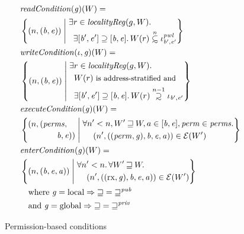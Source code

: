 \documentclass[compsoc,conference,letterpaper,fleqn]{IEEEtran}
\newcommand\subsetsim{\mathrel{\ooalign{\raise.2ex\hbox{$\subset$}\cr
      \hidewidth\lower.8ex\hbox{\scalebox{0.9}{$\sim$}}\hidewidth\cr}}}
\newcommand\supsetsim{\mathrel{\ooalign{\raise.2ex\hbox{$\supset$}\cr
      \hidewidth\lower.8ex\hbox{\scalebox{0.9}{$\sim$}}\hidewidth\cr}}}
\newcommand{\nsubsim}[1][n]{\stackrel{\tiny{#1}}{\subsetsim}}
\newcommand{\nsupsim}[1][n]{\stackrel{\tiny{#1}}{\supsetsim}}
\newcommand{\var}[1]{\mathit{#1}}
\newcommand{\gl}{\var{g}}
\newcommand{\addr}{\var{a}}
\newcommand{\start}{\var{b}}
\newcommand{\addrend}{\var{e}}
\newcommand{\perm}{\var{perm}}
\newcommand{\pwl}{\var{pwl}}
\newcommand{\plainfun}[2]{
  \ifthenelse{\equal{#2}{}}
  {\mathit{#1}}
  {\mathit{#1}(#2)}
}
\newcommand{\readCond}[1]{\plainfun{readCondition}{#1}}
\newcommand{\writeCond}[1]{\plainfun{writeCondition}{#1}}
\newcommand{\execCond}[1]{\plainfun{executeCondition}{#1}}
\newcommand{\entryCond}[1]{\plainfun{enterCondition}{#1}}
\newcommand{\future}{\mathbin{\sqsupseteq}}
\newcommand{\futurewk}{\mathbin{\sqsupseteq}^{\var{pub}}}
\newcommand{\futurestr}{\mathbin{\sqsupseteq}^{\var{priv}}}
\newcommand{\asmType}{\plaindom{AsmType}}
\newcommand{\plaindom}[1]{\mathrm{#1}}
\newcommand{\intr}[2]{\mathcal{#1}}
\newcommand{\exprintr}[1]{\intr{E}{#1}}
\newcommand{\stder}{\exprintr{\asmType}}
\newcommand{\npair}[2][n]{\left(#1,#2 \right)}
\newcommand{\npairP}[2][n]{(#1,#2)}
\newcommand{\plainperm}[1]{\mathrm{#1}}
\newcommand{\exec}{\plainperm{rx}}
\newcommand{\local}{\plainperm{local}}
\newcommand{\glob}{\plainperm{global}}
\begin{document}
{\begin{figure}[htbp]
  \centering
  \begin{align*}
  & \readCond{}(\gl)(W) =  \\
  & \left\{ \npair{(\start,\addrend)} \; \middle| \;
    \begin{aligned}
      & \exists r \in \var{localityReg}(g,W) \ldotp \\
      & \;\; \exists [\start',\addrend'] \supseteq [\start,\addrend] \ldotp W(r)\nsubsim[n] \iota_{\start',\addrend'}^\pwl 
    \end{aligned} \right\}\\
  & \writeCond{}(\iota,\gl)(W) =  \\
  & \left\{
    \npair{(\start,\addrend)}
    \; \middle| \;
    \begin{aligned}
      & \exists r \in \var{localityReg}(g,W) \ldotp \\
      & \;\; W(r) \text{\footnotesize{ is address-stratified and}} \\
      & \;\; \exists [\start',\addrend'] \supseteq [\start,\addrend] \ldotp W(r)\nsupsim[n-1] \iota_{\start',\addrend'}
    \end{aligned} \right\}\\
  & \execCond{}(\gl)(W) = \\
  & \left\{
    \begin{multlined}
      \npairP{(\var{perms}, \\
        \start,\addrend)}
    \end{multlined}
     \; \middle| \;
    \begin{aligned}
      & \forall n' < n, W' \future W, a \in [\start,\addrend], \perm \in \var{perms} \ldotp \\
      & \;\;\;\; \npair[n']{((\perm,\gl),\start,\addrend,\addr)} \in \stder(W')\\
    \end{aligned} \right\} \\
  & \entryCond{}(\gl)(W) = \\
  & \left\{ \npair{(\start,\addrend,\addr)} \; \middle| \;
    \begin{aligned}
 &  \forall n' < n \ldotp \forall W' \future W \ldotp\\
      & \quad \npair[n']{((\exec,\gl),\start,\addrend,\addr)} \in \stder(W')
    \end{aligned} \right\} \\
  & \quad \text{where } \gl = \local \Rightarrow \future = \futurewk \\
  & \quad \text{and } \gl = \glob \Rightarrow \future = \futurestr
  \end{align*}
\caption{Permission-based conditions}
\label{fig:perm-conds}
\end{figure}
}
\end{document}
